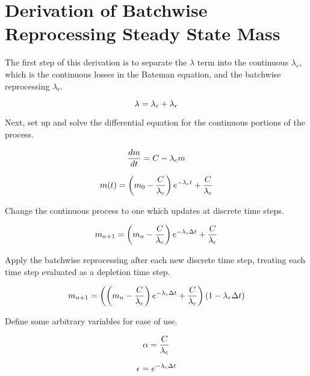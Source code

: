 
\section{Derivation of Batchwise Reprocessing Steady State Mass}

The first step of this derivation is to separate the $\lambda$ term into the continuous $\lambda_c$, which is the continuous losses in the Bateman equation, and the batchwise reprocessing $\lambda_r$.

\begin{equation} \hfill
\lambda = \lambda_c + \lambda_r
\hfill \end{equation}

Next, set up and solve the differential equation for the continuous portions of the process.

\begin{equation} \hfill
\frac{dm}{dt} = C - \lambda_c m
\hfill \end{equation}

\begin{equation} \hfill
m(t) = \left(m_0 - \frac{C}{\lambda_c} \right) e^{-\lambda_c t}  + \frac{C}{\lambda_c}
\hfill \end{equation}

Change the continuous process to one which updates at discrete time steps.

\begin{equation} \hfill
m_{n+1} = \left(m_n - \frac{C}{\lambda_c} \right) e^{-\lambda_c \Delta t}  + \frac{C}{\lambda_c}
\hfill \end{equation}

Apply the batchwise reprocessing after each new discrete time step, treating each time step evaluated as a depletion time step.

\begin{equation} \hfill
m_{n+1} = \left(\left(m_n - \frac{C}{\lambda_c} \right) e^{-\lambda_c \Delta t}  + \frac{C}{\lambda_c}\right) \left(1 - {\lambda_r \Delta t} \right)
\hfill \end{equation}

Define some arbitrary variables for ease of use.

\begin{equation} \hfill
\alpha = \frac{C}{\lambda_c}
\hfill \end{equation}

\begin{equation} \hfill
\epsilon = e^{-\lambda_c \Delta t}
\hfill \end{equation}

